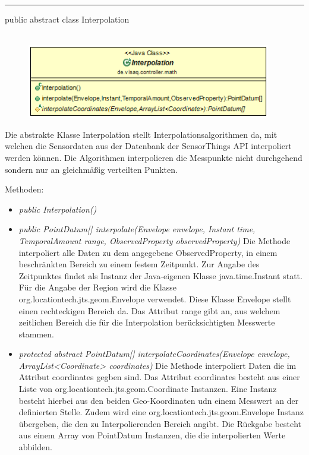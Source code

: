 \rule{\textwidth}{0.4pt}
public abstract class Interpolation
\\\\
\begin{minipage}{0.4\textwidth}
    \begin{figure}[H]
        {\centering\includegraphics[width=0.95\textwidth]{media/backend/controller/classes/Interpolation.png}}
    \end{figure}
    \end{minipage} \hfill
\begin{minipage}{0.6\textwidth}
    Die abstrakte Klasse Interpolation stellt Interpolationsalgorithmen da, mit welchen die Sensordaten aus der Datenbank der \gls{SensorThings API} interpoliert werden können.
    Die Algorithmen interpolieren die Messpunkte nicht durchgehend sondern nur an gleichmäßig verteilten Punkten.
\end{minipage}

Methoden:
\begin{itemize}
    \item \emph{public Interpolation()}
    \item \emph{public PointDatum[] interpolate(Envelope envelope, Instant time, TemporalAmount range, ObservedProperty observedProperty)}
    Die Methode interpoliert alle Daten zu dem angegebene ObservedProperty, in einem beschränkten Bereich zu einem festem Zeitpunkt.
    Zur Angabe des Zeitpunktes findet als Instanz der Java-eigenen Klasse java.time.Instant statt.
    Für die Angabe der Region wird die Klasse org.locationtech.jts.geom.Envelope verwendet.
    Diese Klasse Envelope stellt einen rechteckigen Bereich da.
    Das Attribut range gibt an, aus welchem zeitlichen Bereich die für die Interpolation berücksichtigten Messwerte stammen.
    \item \emph{protected abstract PointDatum[] interpolateCoordinates(Envelope envelope, ArrayList<Coordinate> coordinates)}
    Die Methode interpoliert Daten die im Attribut coordinates gegben sind.
    Das Attribut coordinates besteht aus einer Liste von org.locationtech.jts.geom.Coordinate Instanzen.
    Eine Instanz besteht hierbei aus den beiden Geo-Koordinaten udn einem Messwert an der definierten Stelle.
    Zudem wird eine org.locationtech.jts.geom.Envelope Instanz übergeben, die den zu Interpolierenden Bereich angibt.
    Die Rückgabe besteht aus einem Array von PointDatum Instanzen, die die interpolierten Werte abbilden.
\end{itemize}

